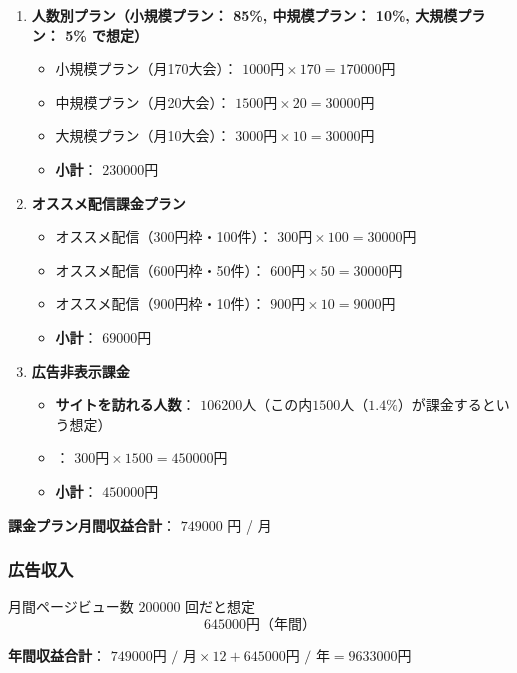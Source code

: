 \begin{enumerate}
    \item \textbf{人数別プラン（小規模プラン： 85\%, 中規模プラン： 10\%, 大規模プラン： 5\% で想定）}
    \begin{itemize}
        \item 小規模プラン（月170大会）： $\num{1000} \text{円} \times 170 = \num{170000} \text{円}$
        \item 中規模プラン（月20大会）： $\num{1500} \text{円} \times 20 = \num{30000} \text{円}$
        \item 大規模プラン（月10大会）： $\num{3000} \text{円} \times 10 = \num{30000} \text{円}$
        \item \textbf{小計}： $\num{230000} \text{円}$
    \end{itemize}

    \item \textbf{オススメ配信課金プラン}
    \begin{itemize}
        \item オススメ配信（$\num{300} \text{円枠}$・100件）： $\num{300} \text{円} \times 100 = \num{30000} \text{円}$
        \item オススメ配信（$\num{600} \text{円枠}$・50件）： $\num{600} \text{円} \times 50 = \num{30000} \text{円}$
        \item オススメ配信（$\num{900} \text{円枠}$・10件）： $\num{900} \text{円} \times 10 = \num{9000} \text{円}$
        \item \textbf{小計}： $\num{69000} \text{円}$
    \end{itemize}

    \item \textbf{広告非表示課金}
    \begin{itemize}
        \item \textbf{サイトを訪れる人数}： $\num{106200} \text{人}$（この内$\num{1500} \text{人}（1.4\%）$が課金するという想定）
        \item ： $\num{300} \text{円} \times \num{1500} = \num{450000} \text{円}$
        \item \textbf{小計}： $\num{450000} \text{円}$
    \end{itemize}
\end{enumerate}

\noindent\textbf{課金プラン月間収益合計}： $\num{749000}$ 円 / 月

\subsubsection*{広告収入}
月間ページビュー数 $\num{200000}$ 回だと想定\cite{google_adsense}
\[
\num{645000} \text{円（年間）}
\]


\noindent\textbf{年間収益合計}： $\num{749000} \text{円 / 月} \times 12 + \num{645000} \text{円 / 年} = \num{9633000} \text{円}$